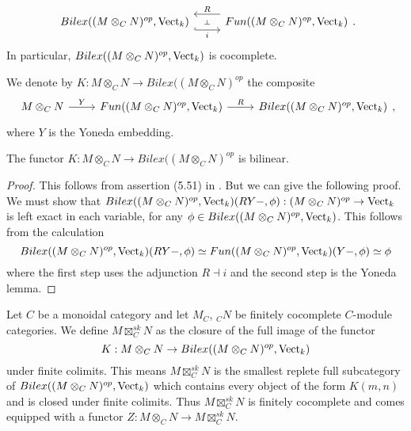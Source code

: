 \[\begin{tikzcd}
            {Bilex((M\otimes_C N)^{op},\Vect_k)} & {Fun((M\otimes_C N)^{op},\Vect_k)}
            \arrow[""{name=0, anchor=center, inner sep=0}, "i"', shift right=3, hook, from=1-1, to=1-2]
            \arrow[""{name=1, anchor=center, inner sep=0}, "R"', shift right=3, from=1-2, to=1-1]
            \arrow["\dashv"{anchor=center, rotate=-90}, draw=none, from=1, to=0]
\end{tikzcd}.\]
In particular, $Bilex((M\otimes_C N)^{op},\operatorname{Vect}_k)$ is cocomplete.

\begin{definition}\label{def_K}

  \noindent We denote by $K:M\otimes_C N\to Bilex((M\otimes_C N)^{op}$ the composite
  \[
  \begin{tikzcd}
    {M\otimes_C N} & {Fun((M\otimes_C N)^{op},\Vect_k)} & {Bilex((M\otimes_C N)^{op},\Vect_k)}
    \arrow["Y", from=1-1, to=1-2]
    \arrow["R", from=1-2, to=1-3]
  \end{tikzcd},
  \]
  where $Y$ is the Yoneda embedding.\end{definition}
\begin{lemma}\label{right_exact_0}

The functor $K:M\otimes_C N\to Bilex((M\otimes_C N)^{op}$ is bilinear.\end{lemma}

\begin{proof}

  This follows from assertion (5.51) in \cite{kelly/basic-concepts-enriched}.
  But we can give the following proof. We must show that $Bilex((M\otimes_C
  N)^{op},\operatorname{Vect}_k)(RY-,\phi):(M\otimes_C N)^{op}\to\operatorname{Vect}_k$ is left exact in
  each variable, for any $\phi\in Bilex((M\otimes_C N)^{op},\operatorname{Vect}_k)$. This
  follows from the calculation $$Bilex((M\otimes_C
  N)^{op},\operatorname{Vect}_k)(RY-,\phi)\simeq Fun((M\otimes_C
  N)^{op},\operatorname{Vect}_k)(Y-,\phi)\simeq \phi$$ where the first step uses the
  adjunction $R\dashv i$ and the second step is the Yoneda lemma.
\end{proof}

\begin{definition}\label{sk_nonsemisimple}

  \noindent Let $C$ be a monoidal category and let $M_C$, $_{C}N$ be finitely
  cocomplete $C$-module categories. We define $M\boxtimes_C^{sk}N$ as the
  closure of the full image of the functor $$K:M\otimes_C N \to
  Bilex((M\otimes_C N)^{op},\operatorname{Vect}_k)$$ under finite colimits. This means
  $M\boxtimes_C^{sk}N$ is the smallest replete full subcategory of
  $Bilex((M\otimes_C N)^{op},\operatorname{Vect}_k)$ which contains every object of the form
  $K(m,n)$ and is closed under finite colimits. Thus $M\boxtimes_C^{sk}N$ is
  finitely cocomplete and comes equipped with a functor $Z:M\otimes_C N \to
  M\boxtimes_C^{sk}N$.
\end{definition}

